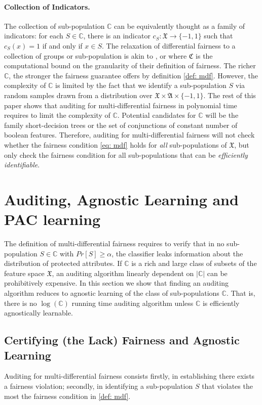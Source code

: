 \documentclass{article}
\begin{document}
\paragraph{Collection of Indicators.}
The collection of sub-population $\mathbb{C}$ can be equivalently thought as a family of indicators: for each $S\in \mathbb{C}$, there is an indicator $c_{S}: \mathfrak{X}\rightarrow \{-1, 1\}$ such that $c_{S}(x)=1$ if and only if $x\in S$. The relaxation of differential fairness to a collection of groups or sub-population is akin to \cite{kim2018fairness}, \cite{kearns2017preventing} or \cite{hebert2017calibration} where $\mathfrak{C}$ is the computational bound on the granularity of their definition of fairness. The richer $\mathbb{C}$, the stronger the fairness guarantee offers by definition \ref{def: mdf}. However, the complexity of $\mathbb{C}$ is limited by the fact that we identify a sub-population $S$ via random samples drawn from a distribution over $\mathfrak{X} \times \mathfrak{A}\times \{-1, 1\}$. The rest of this paper shows that auditing for multi-differential fairness in polynomial time requires to limit the complexity of $\mathbb{C}$. Potential candidates for $\mathbb{C}$ will be the family short-decision trees or the set of conjunctions of constant number of boolean features. Therefore, auditing for multi-differential fairness will not check whether the fairness condition \eqref{eq: mdf} holds for \textit{all} sub-populations of $\mathfrak{X}$, but only check  the fairness condition for all sub-populations that can be \textit{efficiently identifiable}. 


\section{Auditing, Agnostic Learning and PAC learning}

The definition of multi-differential fairness requires to verify that in no sub-population $S\in \mathbb{C}$ with $Pr[S]\geq \alpha$, the classifier leaks information about the distribution of protected attributes. If $\mathbb{C}$ is a rich and large class of subsets of the feature space $\mathfrak{X}$, an auditing algorithm linearly dependent on $|\mathbb{C}|$ can be prohibitively expensive. In this section we show that finding an auditing algorithm reduces to agnostic learning of the class of sub-populations $\mathbb{C}$. That is, there is no $\log(\mathbb{C})$ running time auditing algorithm unless $\mathbb{C}$ is efficiently agnostically learnable.  

\subsection{Certifying (the Lack) Fairness and Agnostic Learning}
Auditing for multi-differential fairness consists firstly, in establishing there exists a fairness violation; secondly, in identifying a sub-population $S$ that violates the most the fairness condition in \ref{def: mdf}. 
\end{document}
